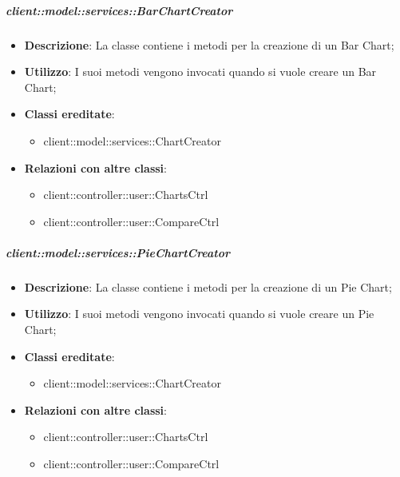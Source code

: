 \begin{itemize}
		\subparagraph{client::model::services::BarChartCreator} %
		\label{subp:barchartcreator}
			\begin{itemize}
				\item \textbf{Descrizione}: La classe contiene i metodi per la creazione di un Bar Chart;
				\item \textbf{Utilizzo}: I suoi metodi vengono invocati quando si vuole creare un Bar Chart;
				\item \textbf{Classi ereditate}:					
					\begin{itemize}
						\item client::model::services::ChartCreator
					\end{itemize}
				\item \textbf{Relazioni con altre classi}:					
					\begin{itemize}
						\item client::controller::user::ChartsCtrl
						\item client::controller::user::CompareCtrl
					\end{itemize}
			\end{itemize}

		\subparagraph{client::model::services::PieChartCreator} %
		\label{subp:piechartcreator}
			\begin{itemize}
				\item \textbf{Descrizione}: La classe contiene i metodi per la creazione di un Pie Chart;
				\item \textbf{Utilizzo}: I suoi metodi vengono invocati quando si vuole creare un Pie Chart;
				\item \textbf{Classi ereditate}:					
					\begin{itemize}
						\item client::model::services::ChartCreator
					\end{itemize}
				\item \textbf{Relazioni con altre classi}:					
					\begin{itemize}
						\item client::controller::user::ChartsCtrl
						\item client::controller::user::CompareCtrl
					\end{itemize}
			\end{itemize}


\end{itemize}
